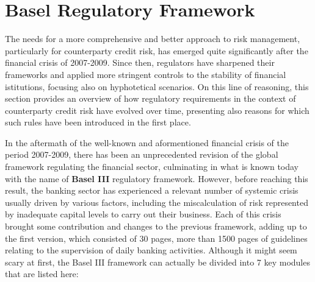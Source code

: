 \documentclass[a4paper,12pt]{article}
\begin{document}

        

    



    
    \pagebreak
    \section{Basel Regulatory Framework}

    The needs for a more comprehensive and better approach to risk management, particularly for counterparty credit risk,
    has emerged quite significantly after the financial crisis of 2007-2009. Since then, regulators have sharpened their 
    frameworks and applied more stringent controls to the stability of financial istitutions, focusing also on hyphotetical 
    scenarios. On this line of reasoning, this section provides an overview of how regulatory requirements in the context of counterparty credit
    risk have evolved over time, presenting also reasons for which such rules have been introduced in the first place.

    In the aftermath of the well-known and aformentioned financial crisis of the period 2007-2009, there has been an unprecedented
    revision of the global framework regulating the financial sector, culminating in what is known today with the name of \textbf{Basel III} regulatory framework.
    However, before reaching this result, the banking sector has experienced a relevant number of systemic crisis usually driven by various factors,
    including the miscalculation of risk represented by inadequate capital levels to carry out their business. Each of this crisis brought some contribution 
    and changes to the previous framework, adding up to the first version, which consisted of 30 pages, more than 1500 pages of guidelines relating to the 
    supervision of daily banking activities. Although it might seem scary at first, the Basel III framework can actually be divided into 7 key modules that are
    listed here:
\end{document}
